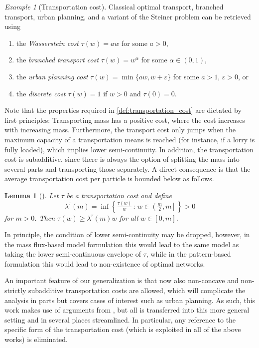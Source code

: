\documentclass[10pt,a4paper,oneside,final]{article}
\newcommand{\transportPath}{mass flux}
\numberwithin{equation}{section}
\theoremstyle{plain}
\newtheorem{lemma}[theorem]{Lemma}
\theoremstyle{definition}
\theoremstyle{remark}
\newtheorem{example}[theorem]{Example}
\begin{document}
\begin{example}[Transportation cost]
Classical optimal transport, branched transport, urban planning, and a variant of the Steiner problem can be retrieved using
\begin{enumerate}
\item the \emph{Wasserstein cost} $\tau(w)=aw$ for some $a>0$,
\item the \emph{branched transport cost} $\tau(w)=w^\alpha$ for some $\alpha\in(0,1)$,
\item the \emph{urban planning cost} $\tau(w)=\min\{aw,w+\varepsilon\}$ for some $a>1$, $\varepsilon>0$, or
\item the \emph{discrete cost} $\tau(w)=1$ if $w>0$ and $\tau(0)=0$.
\end{enumerate}
\end{example}

Note that the properties required in \cref{def:transportation_cost} are dictated by first principles:
Transporting mass has a positive cost, where the cost increases with increasing mass.
Furthermore, the transport cost only jumps when the maximum capacity of a transportation means is reached (for instance, if a lorry is fully loaded), which implies lower semi-continuity.
In addition, the transportation cost is subadditive,
since there is always the option of splitting the mass into several parts and transporting those separately.
A direct consequence is that the average transportation cost per particle is bounded below as follows.

\begin{lemma}[]\label{thm:averageCost}
Let $\tau$ be a transportation cost and define $$\lambda^\tau(m)=\inf\left\{\tfrac{\tau(w)}w\,:\,w\in\left(\tfrac m2,m\right]\right\}>0$$ for $m>0$.
Then $\tau(w)\geq\lambda^\tau(m)w$ for all $w\in[0,m]$.
\end{lemma}

In principle, the condition of lower semi-continuity may be dropped, however,
in the \transportPath{}-based model formulation this would lead to the same model as taking the lower semi-continuous envelope of $\tau$,
while in the pattern-based formulation this would lead to non-existence of optimal networks.

An important feature of our generalization is that now also non-concave and non-strictly subadditive transportation costs are allowed, which will complicate the analysis in parts but covers cases of interest such as urban planning.
As such, this work makes use of arguments from \cite{Xia-Optimal-Paths,Maddalena-Morel-Solimini-Irrigation-Patterns,Bernot-Caselles-Morel-Traffic-Plans,Maddalena-Solimini-Transport-Distances,Maddalena-Solimini-Synchronic,BrWi15-equivalent},
but all is transferred into this more general setting and in several places streamlined.
In particular, any reference to the specific form of the transportation cost (which is exploited in all of the above works) is eliminated.
\end{document}
